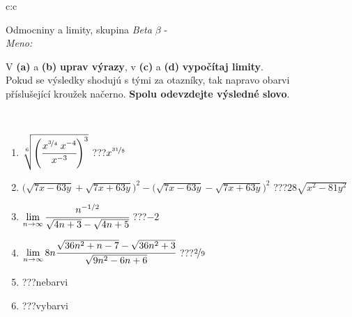 \documentclass[10pt]{report}
\begin{document}
\newpage
\thispagestyle{empty}
\begin{tabular}{c:c}
\begin{minipage}[c][104.5mm][t]{0.5\linewidth}
\begin{center}
\vspace{7mm}
{\huge Odmocniny a limity, skupina \textit{Beta $\beta$} -}\\[5mm]
\textit{Meno:}\phantom{xxxxxxxxxxxxxxxxxxxxxxxxxxxxxxxxxxxxxxxxxxxxxxxxxxxxxxxxxxxxxxxxx}\\[5mm]
\begin{minipage}{0.95\linewidth}
\begin{center}
V \textbf{(a)} a \textbf{(b)} \textbf{uprav výrazy}, v \textbf{(c)} a \textbf{(d)} \textbf{vypočítaj limity}.\\Pokud se výsledky shodujú s tými za otazníky, tak napravo obarvi\\příslušející kroužek načerno. \textbf{Spolu odevzdejte výsledné slovo}.
\end{center}
\end{minipage}
\\[1mm]
\begin{minipage}{0.79\linewidth}
\begin{center}
\begin{varwidth}{\linewidth}
\begin{enumerate}
\small
\item $\sqrt[6]{\left(\cfrac{x^{\nicefrac{3}{4}}\;x^{-4}}{x^{-3}}\right)^{3}}$\quad \dotfill\; ???\;\dotfill \quad $x^{\nicefrac{31}{8}}$
\item {\footnotesize{\scriptsize$\big(\sqrt{7x-63y}+\sqrt{7x+63y}\big)^2-\big(\sqrt{7x-63y}-\sqrt{7x+63y}\big)^2$}\quad \dotfill\; ???\;\dotfill \quad $28\sqrt{x^2-81y^2}$}
\item $\lim\limits_{n\to\infty}\cfrac{n^{-1/2}}{\sqrt{4n+3}-\sqrt{4n+5}}$\quad \dotfill\; ???\;\dotfill \quad $-2$
\item $\lim\limits_{n\to\infty}8n\cfrac{\sqrt{36n^2+n-7}-\sqrt{36n^2+3}}{\sqrt{9n^2-6n+6}}$\quad \dotfill\; ???\;\dotfill \quad $\nicefrac{2}{9}$
\item \quad \dotfill\; ???\;\dotfill \quad nebarvi
\item \quad \dotfill\; ???\;\dotfill \quad vybarvi
\end{enumerate}
\end{varwidth}
\end{center}
\end{minipage}
\begin{minipage}{0.20\linewidth}

\end{minipage}
\end{center}
\end{minipage}
\end{tabular}
\end{document}
